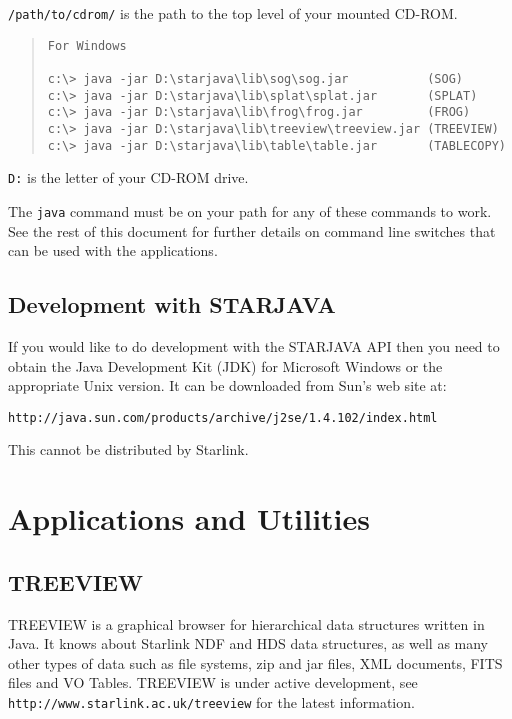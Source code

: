 \documentclass[twoside,11pt]{article}
\newcommand{\htmladdnormallink}[2]{#1}
\newcommand{\xlabel}[1]{}
\renewcommand{\_}{\texttt{\symbol{95}}}
\begin{document}
\texttt{/path/to/cdrom/} is the path to the top level of your mounted CD-ROM.

\begin{quote}
\begin{verbatim}
For Windows

c:\> java -jar D:\starjava\lib\sog\sog.jar           (SOG)
c:\> java -jar D:\starjava\lib\splat\splat.jar       (SPLAT)
c:\> java -jar D:\starjava\lib\frog\frog.jar         (FROG)
c:\> java -jar D:\starjava\lib\treeview\treeview.jar (TREEVIEW)
c:\> java -jar D:\starjava\lib\table\table.jar       (TABLECOPY)
\end{verbatim}
\end{quote}
\texttt{D:} is the letter of your CD-ROM drive.

The \texttt{java} command must be on your path for any of these commands to work.
See the rest of this document for further details on command
line switches that can be used with the applications.

\subsection{\label{development}\xlabel{development}Development with STARJAVA}

If you would like to do development with the STARJAVA API then you need to
obtain the Java Development Kit (JDK) for Microsoft Windows or the appropriate
Unix version. It can be downloaded from Sun's web site at:

\htmladdnormallink{\texttt{http://java.sun.com/products/archive/j2se/1.4.1\_02/index.html}}{http://java.sun.com/products/archive/j2se/1.4.1\_02/index.html}

This cannot be distributed by Starlink.

\section{\label{Applications}\xlabel{Applications}Applications and Utilities} 

\subsection{\label{treeview}\xlabel{treeview}TREEVIEW}

TREEVIEW is a graphical browser for hierarchical data structures written 
in Java. It knows about Starlink NDF and HDS data structures, as well 
as many other types of data such as file systems, zip and jar files, XML 
documents, FITS files and VO Tables. TREEVIEW is under active development,
see 
\htmladdnormallink{\texttt{http://www.starlink.ac.uk/treeview}}{http://www.starlink.ac.uk/treeview}
for the latest information.
\end{document}
